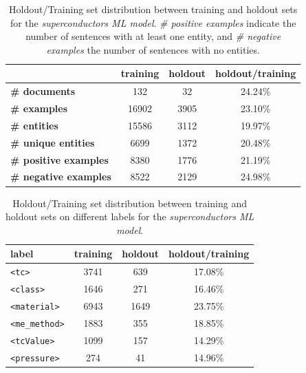 \documentclass[]{interact}
\theoremstyle{plain}%
\theoremstyle{definition}
\theoremstyle{remark}
\begin{document}
\begin{table}[ht]
\centering\small
\begin{tabular}{lccc}
\toprule
& \textbf{training}  & \textbf{holdout} & \textbf{holdout/training}      \\
\midrule
\textbf{\# documents}        & 132   & 32    & 24.24\%   \\
\textbf{\# examples}       & 16902 & 3905  & 23.10\%   \\
\textbf{\# entities}        & 15586 & 3112  & 19.97\%   \\
\textbf{\# unique entities} & 6699  & 1372  & 20.48\%   \\
\textbf{\# positive examples}    & 8380  & 1776  & 21.19\%   \\
\textbf{\# negative examples}    & 8522  & 2129  & 24.98\%   \\
\bottomrule

\end{tabular}

\caption{Holdout/Training set distribution between training and holdout sets for the \textit{superconductors ML model}. \textit{\# positive examples} indicate the number of sentences with at least one entity, and \textit{\# negative examples} the number of sentences with no entities.}
\label{tab:training-holdout-set-distribution-annex}
\end{table}

\begin{table}[ht]
\centering\small
\begin{tabular}{lccc}
\toprule
label & \textbf{training}  & \textbf{holdout} & \textbf{holdout/training }     \\
\midrule
\texttt{<tc>}           & 3741      & 639   & 17.08\%   \\
\texttt{<class>}        & 1646      & 271   & 16.46\%   \\
\texttt{<material>}     & 6943      & 1649  & 23.75\%   \\
\texttt{<me\_method>}   & 1883      & 355   & 18.85\%   \\
\texttt{<tcValue>}      & 1099      & 157   & 14.29\%   \\
\texttt{<pressure>}     & 274       & 41    & 14.96\%   \\
\bottomrule

\end{tabular}

\caption{Holdout/Training set distribution between training and holdout sets on different labels for the \textit{superconductors ML model}.}
\label{tab:training-holdout-labels-distribution-annex}
\end{table}
\end{document}
